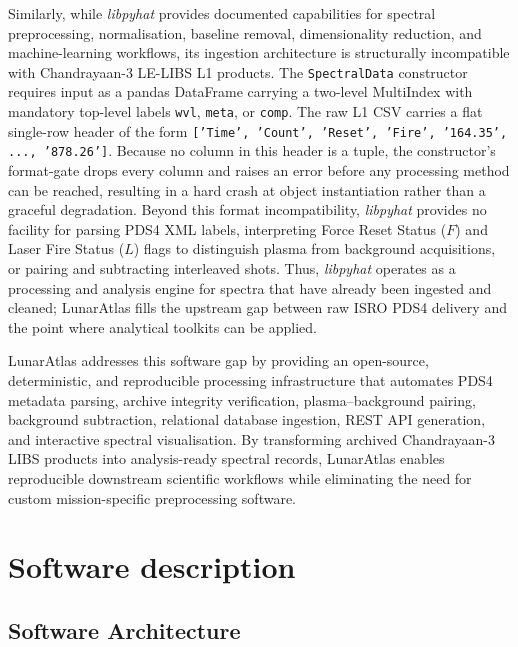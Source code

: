 \documentclass[final,5p,twocolumn,a4paper]{elsarticle}
\begin{document}
Similarly, while \emph{libpyhat} provides documented capabilities for spectral preprocessing, normalisation, baseline removal, dimensionality reduction, and machine-learning workflows, its ingestion architecture is structurally incompatible with Chandrayaan-3 LE-LIBS L1 products. The \texttt{SpectralData} constructor requires input as a pandas DataFrame carrying a two-level MultiIndex with mandatory top-level labels \texttt{wvl}, \texttt{meta}, or \texttt{comp}. The raw L1 CSV carries a flat single-row header of the form \texttt{['Time', 'Count', 'Reset', 'Fire', '164.35', ..., '878.26']}. Because no column in this header is a tuple, the constructor's format-gate drops every column and raises an error before any processing method can be reached, resulting in a hard crash at object instantiation rather than a graceful degradation. Beyond this format incompatibility, \emph{libpyhat} provides no facility for parsing PDS4 XML labels, interpreting Force Reset Status ($F$) and Laser Fire Status ($L$) flags to distinguish plasma from background acquisitions, or pairing and subtracting interleaved shots. Thus, \emph{libpyhat} operates as a processing and analysis engine for spectra that have already been ingested and cleaned; LunarAtlas fills the upstream gap between raw ISRO PDS4 delivery and the point where analytical toolkits can be applied.

LunarAtlas addresses this software gap by providing an open-source, deterministic, and reproducible processing infrastructure that automates PDS4 metadata parsing, archive integrity verification, plasma--background pairing, background subtraction, relational database ingestion, REST API generation, and interactive spectral visualisation. By transforming archived Chandrayaan-3 LIBS products into analysis-ready spectral records, LunarAtlas enables reproducible downstream scientific workflows while eliminating the need for custom mission-specific preprocessing software.

\section{Software description}

\subsection{Software Architecture}
\end{document}
